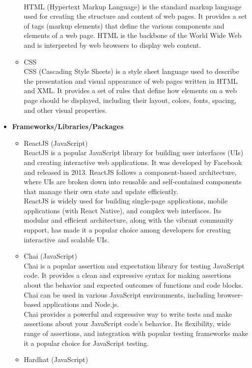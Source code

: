 \documentclass[oneside, 12pt]{book}
\begin{document}
\begin{itemize}
\begin{itemize}
							\\HTML (Hypertext Markup Language) is the standard markup language used for creating the structure and content of web pages. It provides a set of tags (markup elements) that define the various components and elements of a web page. HTML is the backbone of the World Wide Web and is interpreted by web browsers to display web content.
						\item CSS
							\\CSS (Cascading Style Sheets) is a style sheet language used to describe the presentation and visual appearance of web pages written in HTML and XML. It provides a set of rules that define how elements on a web page should be displayed, including their layout, colors, fonts, spacing, and other visual properties.
					\end{itemize}
				\item\textbf{Frameworks/Libraries/Packages}
					\begin{itemize}
						\item ReactJS (JavaScript)
							\\ReactJS is a popular JavaScript library for building user interfaces (UIs) and creating interactive web applications. It was developed by Facebook and released in 2013. ReactJS follows a component-based architecture, where UIs are broken down into reusable and self-contained components that manage their own state and update efficiently.
							\\ReactJS is widely used for building single-page applications, mobile applications (with React Native), and complex web interfaces. Its modular and efficient architecture, along with the vibrant community support, has made it a popular choice among developers for creating interactive and scalable UIs.
						\item Chai (JavaScript)
							\\Chai is a popular assertion and expectation library for testing JavaScript code. It provides a clean and expressive syntax for making assertions about the behavior and expected outcomes of functions and code blocks. Chai can be used in various JavaScript environments, including browser-based applications and Node.js.
							\\Chai provides a powerful and expressive way to write tests and make assertions about your JavaScript code's behavior. Its flexibility, wide range of assertions, and integration with popular testing frameworks make it a popular choice for JavaScript testing.
						\item Hardhat (JavaScript)

\end{itemize}
\end{itemize}
\end{document}
